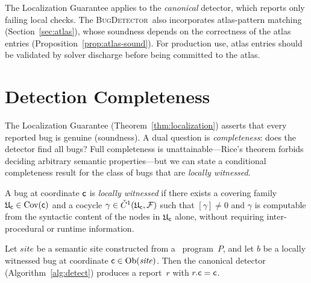 \documentclass[11pt]{article}
\newcommand{\BugDet}{\textsc{BugDetector}}        %
\begin{document}
The Localization Guarantee applies to the \emph{canonical} detector, which
reports only failing local checks.  The \BugDet\ also incorporates
atlas-pattern matching (Section~\ref{sec:atlas}), whose soundness depends
on the correctness of the atlas entries (Proposition~\ref{prop:atlas-sound}).
For production use, atlas entries should be validated by solver discharge
before being committed to the atlas.

\section{Detection Completeness}\label{sec:completeness}

The Localization Guarantee (Theorem~\ref{thm:localization}) asserts that
every reported bug is genuine (soundness).  A dual question is
\emph{completeness}: does the detector find all bugs?  Full completeness
is unattainable---Rice's theorem forbids deciding arbitrary semantic
properties---but we can state a conditional completeness result for
the class of bugs that are \emph{locally witnessed}.

\begin{definition}\label{def:local-witness}
A bug at coordinate $\mathsf{c}$ is \emph{locally witnessed} if there
exists a covering family $\mathfrak{U}_{\mathsf{c}} \in \mathrm{Cov}(\mathsf{c})$ and
a cocycle $\gamma \in \check{C}^1(\mathfrak{U}_{\mathsf{c}},\mathcal{F})$
such that $[\gamma] \neq 0$ and $\gamma$ is computable from the
syntactic content of the nodes in $\mathfrak{U}_{\mathsf{c}}$ alone,
without requiring inter-procedural or runtime information.
\end{definition}

\begin{theorem}\label{thm:completeness}
Let $\mathit{site}$ be a semantic site constructed from a \Python\
program~$P$, and let $b$ be a locally witnessed bug at coordinate
$\mathsf{c} \in \mathrm{Ob}(\mathit{site})$.  Then the canonical detector
(Algorithm~\ref{alg:detect}) produces a report~$r$ with
$r.\mathsf{c} = \mathsf{c}$.
\end{theorem}
\end{document}
